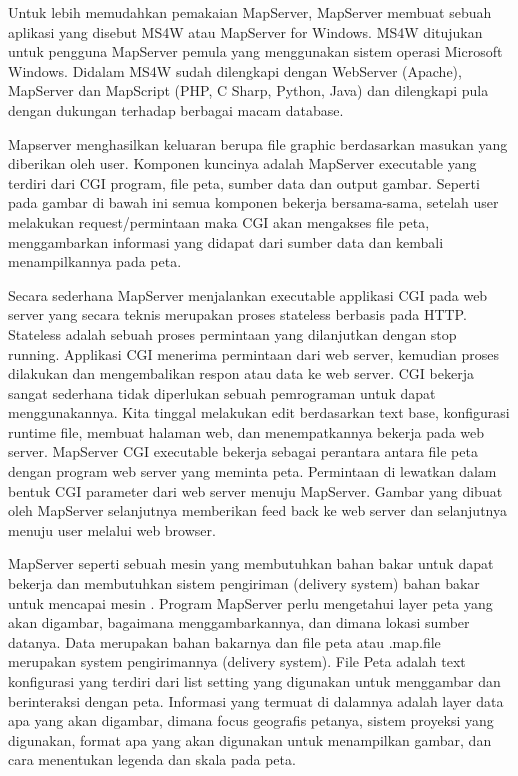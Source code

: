 Untuk lebih memudahkan pemakaian MapServer, MapServer membuat sebuah aplikasi yang disebut MS4W atau MapServer for Windows. MS4W ditujukan untuk pengguna MapServer pemula yang menggunakan sistem operasi Microsoft Windows. Didalam MS4W sudah dilengkapi dengan WebServer (Apache), MapServer dan MapScript (PHP, C Sharp, Python, Java) dan dilengkapi pula dengan dukungan terhadap berbagai macam database.

Mapserver menghasilkan keluaran berupa file graphic berdasarkan masukan yang diberikan oleh user. 
Komponen kuncinya adalah MapServer executable yang terdiri dari CGI program, file peta, sumber data dan output gambar. 
Seperti pada gambar di bawah ini semua komponen bekerja bersama-sama, 
setelah user melakukan request/permintaan maka CGI akan mengakses file peta, 
menggambarkan informasi yang didapat dari sumber data dan kembali menampilkannya pada peta.

Secara sederhana MapServer menjalankan executable applikasi CGI pada web server yang secara teknis merupakan 
proses stateless berbasis pada HTTP. Stateless adalah sebuah proses permintaan yang dilanjutkan dengan stop running. 
Applikasi CGI menerima permintaan dari web server, kemudian proses dilakukan dan mengembalikan respon atau data ke web server.
CGI bekerja sangat sederhana tidak diperlukan sebuah pemrograman untuk dapat menggunakannya. 
Kita tinggal melakukan edit berdasarkan text base, konfigurasi runtime file, membuat halaman web, 
dan menempatkannya bekerja pada web server. MapServer CGI executable bekerja sebagai perantara antara file peta 
dengan program web server yang meminta peta. Permintaan di lewatkan dalam bentuk CGI parameter dari web server menuju MapServer.
Gambar yang dibuat oleh MapServer selanjutnya memberikan feed back ke web server dan selanjutnya menuju 
user melalui web browser.

MapServer seperti sebuah mesin yang membutuhkan bahan bakar untuk dapat bekerja dan membutuhkan sistem pengiriman (delivery system) bahan bakar untuk mencapai mesin . Program MapServer perlu mengetahui layer peta yang akan digambar, bagaimana menggambarkannya, dan dimana lokasi sumber datanya. Data merupakan bahan bakarnya dan file peta atau .map.file merupakan system pengirimannya (delivery system). File Peta adalah text konfigurasi yang terdiri dari list setting yang digunakan untuk menggambar dan berinteraksi dengan peta. Informasi yang termuat di dalamnya adalah layer data apa yang akan digambar, dimana focus geografis petanya, sistem proyeksi yang digunakan, format apa yang akan digunakan untuk menampilkan gambar, dan cara menentukan legenda dan skala pada peta.

